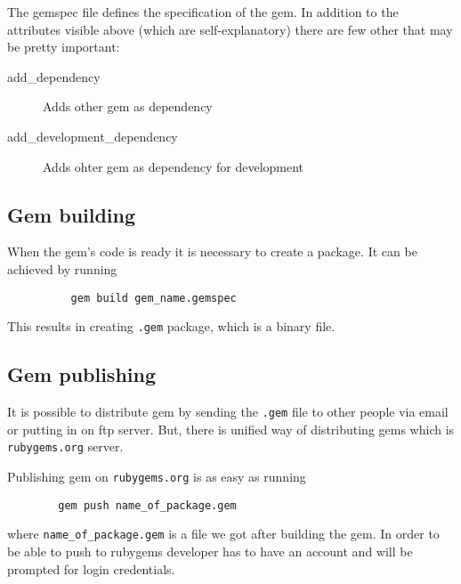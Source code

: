       

      The gemspec file defines the specification of the gem. In addition to the attributes visible
      above (which are self-explanatory) there are few other that may be pretty important:
      \begin{description}
        \item[add\_dependency] Adds other gem as dependency
        \item[add\_development\_dependency] Adds ohter gem as dependency for development
      \end{description}

    \subsection{Gem building}
      When the gem's code is ready it is necessary to create a package. It can be achieved by running

       \begin{lstlisting}
          gem build gem_name.gemspec
        \end{lstlisting}

      This results in creating \texttt{.gem} package, which is a binary file.

    \subsection{Gem publishing}
      It is possible to distribute gem by sending the \texttt{.gem} file to other people via email or
      putting in on ftp server. But, there is unified way of distributing gems which is
      \texttt{rubygems.org} server.

      Publishing gem on \texttt{rubygems.org} is as easy as running

      \begin{lstlisting}
        gem push name_of_package.gem
       \end{lstlisting}

      where \texttt{name\_of\_package.gem} is a file we got after building the gem. In order to be able to
      push to rubygems developer has to have an account and will be prompted for login credentials.
